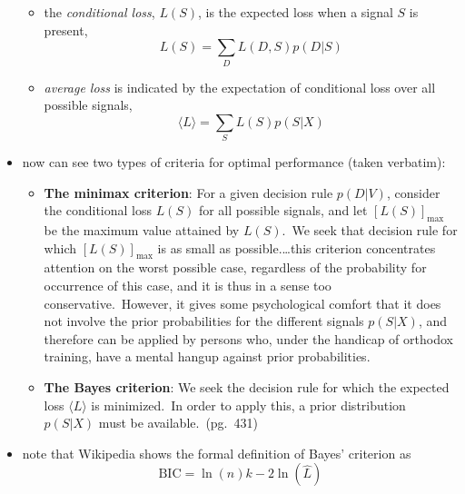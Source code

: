 \documentclass[../jaynes_prob_theory_notes.tex]{subfiles}
\begin{document}
\begin{itemize}
\begin{itemize}
\begin{itemize}
                            \end{itemize}
                        \item the \textit{conditional loss}, \(L(S)\), is the expected loss when a signal \(S\) is present,
                            \begin{equation*} 
                                L(S) = \sum\limits_D L(D,S) p(D|S)
                            \end{equation*}
                        \item \textit{average loss} is indicated by the expectation of conditional loss over all possible signals,
                            \begin{equation*} 
                                \langle L \rangle = \sum\limits_S L(S)p(S|X)
                            \end{equation*}
                    \end{itemize}
                \item now can see two types of criteria for optimal performance (taken verbatim):
                    \begin{itemize} 
                        \item \textbf{The minimax criterion}: For a given decision rule \(p(D|V)\), consider the conditional loss \(L(S)\) for all possible signals, and let \({[L(S)]}_{\max}\) be the maximum value attained by \(L(S)\).\ We seek that decision rule for which \({[L(S)]}_{\max}\) is as small as possible.\ldots this criterion concentrates attention on the worst possible case, regardless of the probability for occurrence of this case, and it is thus in a sense too conservative.\ However, it gives some psychological comfort that it does not involve the prior probabilities for the different signals \(p(S|X)\), and therefore can be applied by persons who, under the handicap of orthodox training, have a mental hangup against prior probabilities. 
                        \item \textbf{The Bayes criterion}: We seek the decision rule for which the expected loss \(\langle L \rangle\) is minimized.\ In order to apply this, a prior distribution \(p(S|X)\) must be available.\ (pg.\ 431)
                    \end{itemize}
                \item note that Wikipedia shows the formal definition of Bayes' criterion as
                    \begin{equation*} 
                        \text{BIC} = \ln(n)k - 2\ln(\hat{L})

\end{equation*}
\end{itemize}
\end{document}
